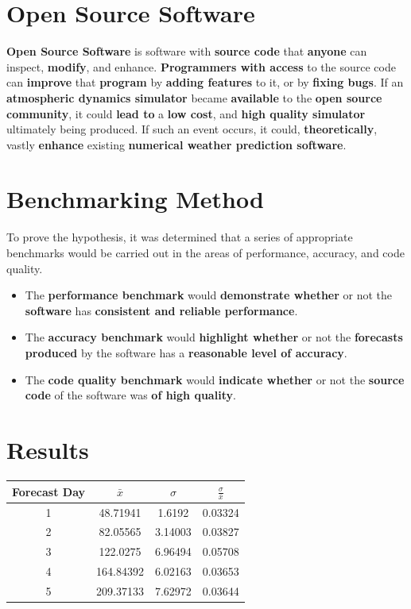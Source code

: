 \documentclass[thesis]{poster_style}
\begin{document}
\begin{poster}
\section{Open Source Software}
\textbf{Open Source Software} is software with \textbf{source code}
that \textbf{anyone} can inspect, \textbf{modify}, and enhance. \textbf{Programmers with access}
to the source code can \textbf{improve} that \textbf{program} by
\textbf{adding features} to it, or by \textbf{fixing bugs}. If an \textbf{atmospheric dynamics simulator} 
became \textbf{available} to the \textbf{open source community}, it could
\textbf{lead to} a \textbf{low cost}, and \textbf{high quality simulator} ultimately being
produced. If such an event occurs, it could, \textbf{theoretically},
vastly \textbf{enhance} existing \textbf{numerical weather prediction software}.

\section{Benchmarking Method}%

To prove the hypothesis, it was determined that a series of appropriate
benchmarks would be carried out in the areas of performance, accuracy,
and code quality.

\begin{itemize}
\item The \textbf{performance benchmark} would \textbf{demonstrate whether} 
or not the \textbf{software} has \textbf{consistent and reliable performance}.
\item The \textbf{accuracy benchmark} would \textbf{highlight whether} or not
the \textbf{forecasts produced} by the software has a \textbf{reasonable level of accuracy}.
\item The \textbf{code quality benchmark} would \textbf{indicate whether} or not the \textbf{source code} 
of the software was \textbf{of high quality}.
\end{itemize}

\section{Results}%

\begin{center}
\begin{tabular}{|c|c|c|c|} 
 \hline
 Forecast Day & $\bar{x}$ & $\sigma$ & $\frac{\sigma}{\bar{x}}$ \\
 \hline
 1 & 48.71941 & 1.6192 & 0.03324 \\
 \hline
 2 & 82.05565 & 3.14003 & 0.03827 \\
 \hline
 3 & 122.0275 & 6.96494 & 0.05708 \\
 \hline
 4 & 164.84392 & 6.02163 & 0.03653 \\
 \hline
 5 & 209.37133 & 7.62972 & 0.03644 \\
 \hline
\end{tabular}\par
\end{center}


\end{poster}
\end{document}
